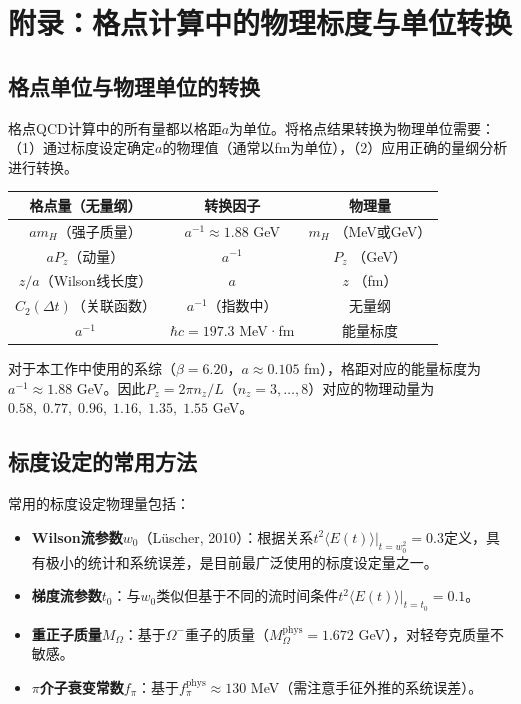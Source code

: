 \documentclass[11pt,a4paper]{ctexart}
\begin{document}
\section{附录：格点计算中的物理标度与单位转换}

\subsection{格点单位与物理单位的转换}

格点QCD计算中的所有量都以格距$a$为单位。将格点结果转换为物理单位需要：（1）通过标度设定确定$a$的物理值（通常以fm为单位），（2）应用正确的量纲分析进行转换。

\begin{center}
\begin{tabular}{c c c}
\toprule
\textbf{格点量（无量纲）} & \textbf{转换因子} & \textbf{物理量} \\
\midrule
$am_H$（强子质量） & $a^{-1} \approx 1.88$ GeV & $m_H$ （MeV或GeV） \\
$aP_z$（动量） & $a^{-1}$ & $P_z$ （GeV） \\
$z/a$（Wilson线长度） & $a$ & $z$ （fm） \\
$C_2(\Delta t)$（关联函数） & $a^{-1}$（指数中） & 无量纲 \\
$a^{-1}$ & $\hbar c = 197.3$ MeV·fm & 能量标度 \\
\bottomrule
\end{tabular}
\end{center}

对于本工作中使用的系综（$\beta = 6.20$，$a \approx 0.105$ fm），格距对应的能量标度为$a^{-1} \approx 1.88$ GeV。因此$P_z = 2\pi n_z / L$（$n_z = 3,\ldots,8$）对应的物理动量为$0.58,\;0.77,\;0.96,\;1.16,\;1.35,\;1.55$ GeV。

\subsection{标度设定的常用方法}

常用的标度设定物理量包括：

\begin{itemize}
  \item \textbf{Wilson流参数$w_0$}（L\"uscher, 2010）：根据关系$t^2 \langle E(t) \rangle |_{t=w_0^2} = 0.3$定义，具有极小的统计和系统误差，是目前最广泛使用的标度设定量之一。
  \item \textbf{梯度流参数$t_0$}：与$w_0$类似但基于不同的流时间条件$t^2 \langle E(t) \rangle |_{t=t_0} = 0.1$。
  \item \textbf{重正子质量$M_\Omega$}：基于$\Omega^-$重子的质量（$M_\Omega^{\text{phys}} = 1.672$ GeV），对轻夸克质量不敏感。
  \item \textbf{$\pi$介子衰变常数$f_\pi$}：基于$f_\pi^{\text{phys}} \approx 130$ MeV（需注意手征外推的系统误差）。
\end{itemize}
\end{document}
